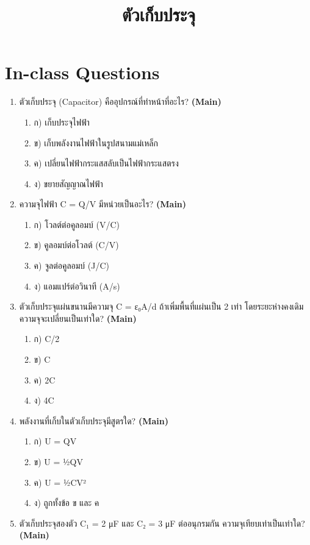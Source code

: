 \documentclass[12pt]{article}
\begin{document}
\title{ตัวเก็บประจุ}
\maketitle
\section*{In-class Questions}
\begin{enumerate}[label=\arabic*.]
\item ตัวเก็บประจุ (Capacitor) คืออุปกรณ์ที่ทำหน้าที่อะไร? \hfill \textbf{\small (Main)}
\begin{enumerate}[label=)]
\item ก) เก็บประจุไฟฟ้า
\item ข) เก็บพลังงานไฟฟ้าในรูปสนามแม่เหล็ก
\item ค) เปลี่ยนไฟฟ้ากระแสสลับเป็นไฟฟ้ากระแสตรง
\item ง) ขยายสัญญาณไฟฟ้า
\end{enumerate}
\item ความจุไฟฟ้า C = Q/V มีหน่วยเป็นอะไร? \hfill \textbf{\small (Main)}
\begin{enumerate}[label=)]
\item ก) โวลต์ต่อคูลอมบ์ (V/C)
\item ข) คูลอมบ์ต่อโวลต์ (C/V)
\item ค) จูลต่อคูลอมบ์ (J/C)
\item ง) แอมแปร์ต่อวินาที (A/s)
\end{enumerate}
\item ตัวเก็บประจุแผ่นขนานมีความจุ C = ε₀A/d ถ้าเพิ่มพื้นที่แผ่นเป็น 2 เท่า โดยระยะห่างคงเดิม ความจุจะเปลี่ยนเป็นเท่าใด? \hfill \textbf{\small (Main)}
\begin{enumerate}[label=)]
\item ก) C/2
\item ข) C
\item ค) 2C
\item ง) 4C
\end{enumerate}
\item พลังงานที่เก็บในตัวเก็บประจุมีสูตรใด? \hfill \textbf{\small (Main)}
\begin{enumerate}[label=)]
\item ก) U = QV
\item ข) U = ½QV
\item ค) U = ½CV²
\item ง) ถูกทั้งข้อ ข และ ค
\end{enumerate}
\item ตัวเก็บประจุสองตัว C₁ = 2 μF และ C₂ = 3 μF ต่ออนุกรมกัน ความจุเทียบเท่าเป็นเท่าใด? \hfill \textbf{\small (Main)}

\end{enumerate}
\end{document}
